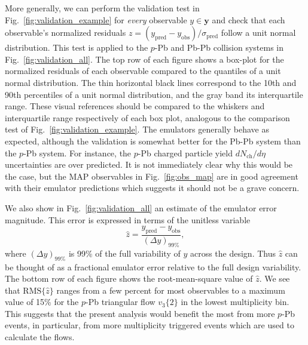 \documentclass[aps,prc,reprint,amsmath,nofootinbib]{revtex4-1}
\newcommand{\nch}{N_\text{ch}}
\newcommand{\yv}{\mathbf y}
\begin{document}
More generally, we can perform the validation test in Fig.~\ref{fig:validation_example} for \emph{every} observable $y \in \yv$ and check that each observable's normalized residuals ${z=(y_\text{pred} - y_\text{obs})/\sigma_\text{pred}}$ follow a unit normal distribution.
This test is applied to the $p$-Pb and Pb-Pb collision systems in Fig.~\ref{fig:validation_all}.
The top row of each figure shows a box-plot for the normalized residuals of each observable compared to the quantiles of a unit normal distribution.
The thin horizontal black lines correspond to the 10th and 90th percentiles of a unit normal distribution, and the gray band its interquartile range.
These visual references should be compared to the whiskers and interquartile range respectively of each box plot, analogous to the comparison test of Fig.~\ref{fig:validation_example}.
The emulators generally behave as expected, although the validation is somewhat better for the Pb-Pb system than the $p$-Pb system.
For instance, the $p$-Pb charged particle yield $d\nch/d\eta$ uncertainties are over predicted.
It is not immediately clear why this would be the case, but the MAP observables in Fig.~\ref{fig:obs_map} are in good agreement with their emulator predictions which suggests it should not be a grave concern.

We also show in Fig.~\ref{fig:validation_all} an estimate of the emulator error magnitude.
This error is expressed in terms of the unitless variable
\begin{equation}
  \hat{z} = \frac{y_\text{pred} - y_\text{obs}}{(\Delta y)_{99\%}},
\end{equation}
where $(\Delta y)_{99\%}$ is 99\% of the full variability of $y$ across the design.
Thus $\hat{z}$ can be thought of as a fractional emulator error relative to the full design variability.
The bottom row of each figure shows the root-mean-square value of $\hat{z}$.
We see that $\text{RMS}\{\hat{z}\}$ ranges from a few percent for most observables to a maximum value of 15\% for the $p$-Pb triangular flow $v_3\{2\}$ in the lowest multiplicity bin.
This suggests that the present analysis would benefit the most from more $p$-Pb events, in particular, from more multiplicity triggered events which are used to calculate the flows.
\end{document}
